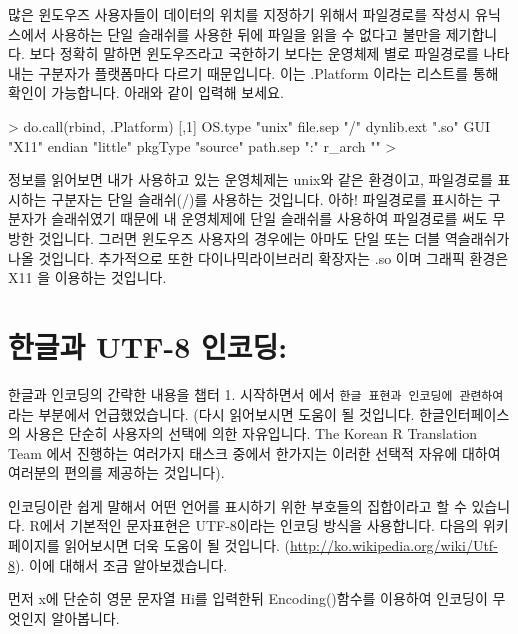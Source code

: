 많은 윈도우즈 사용자들이 데이터의 위치를 지정하기 위해서 파일경로를 작성시 유닉스에서 사용하는 단일 슬래쉬를 사용한 뒤에 파일을 읽을 수 없다고 불만을 제기합니다. 
보다 정확히 말하면 윈도우즈라고 국한하기 보다는 운영체제 별로 파일경로를 나타내는 구분자가 플랫폼마다 다르기 때문입니다. 
이는 .Platform 이라는 리스트를 통해 확인이 가능합니다. 
아래와 같이 입력해 보세요.

\begin{Schunk}
\begin{Soutput}
> do.call(rbind, .Platform)
           [,1]    
OS.type    "unix"  
file.sep   "/"     
dynlib.ext ".so"   
GUI        "X11"   
endian     "little"
pkgType    "source"
path.sep   ":"     
r_arch     ""      
> 
\end{Soutput}
\end{Schunk}

정보를 읽어보면 내가 사용하고 있는 운영체제는 unix와 같은 환경이고, 파일경로를 표시하는 구분자는 단일 슬래쉬(/)를 사용하는 것입니다.
아하! 파일경로를 표시하는 구분자가 슬래쉬였기 때문에 내 운영체제에 단일 슬래쉬를 사용하여 파일경로를 써도 무방한 것입니다.
그러면 윈도우즈 사용자의 경우에는 아마도 단일 또는 더블 역슬래쉬가 나올 것입니다.
추가적으로 또한 다이나믹라이브러리 확장자는 .so 이며 그래픽 환경은 X11 을 이용하는 것입니다. 


\section{한글과 UTF-8 인코딩:} 

한글과 인코딩의 간략한 내용을 챕터 1. 시작하면서 에서 \texttt{한글 표현과 인코딩에 관련하여} 라는 부분에서 언급했었습니다.
(다시 읽어보시면 도움이 될 것입니다.
한글인터페이스의 사용은 단순히 사용자의 선택에 의한 자유입니다.
The Korean R Translation Team 에서 진행하는 여러가지 태스크 중에서 한가지는 이러한 선택적 자유에 대하여 여러분의 편의를 제공하는 것입니다).

인코딩이란 쉽게 말해서 어떤 언어를 표시하기 위한 부호들의 집합이라고 할 수 있습니다.
R에서 기본적인 문자표현은 UTF-8이라는 인코딩 방식을 사용합니다.
다음의 위키페이지를 읽어보시면 더욱 도움이 될 것입니다. (\href{http://ko.wikipedia.org/wiki/Utf-8}{http://ko.wikipedia.org/wiki/Utf-8}).
이에 대해서 조금 알아보겠습니다.

먼저 x에 단순히 영문 문자열 Hi를 입력한뒤 Encoding()함수를 이용하여 인코딩이 무엇인지 알아봅니다.
\begin{Schunk}
\end{Schunk}

